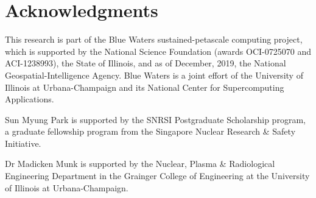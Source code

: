 \section{Acknowledgments}

This research is part of the Blue Waters sustained-petascale computing project,
which is supported by the National Science Foundation (awards OCI-0725070 and
ACI-1238993), the State of Illinois, and as of December, 2019, the National
Geospatial-Intelligence Agency. Blue Waters is a joint effort of the University
of Illinois at Urbana-Champaign and its National Center for Supercomputing
Applications.

Sun Myung Park is supported by the SNRSI Postgraduate Scholarship program, a
graduate fellowship program from the Singapore Nuclear Research \& Safety
Initiative.

Dr Madicken Munk is supported by the Nuclear, Plasma \& Radiological
Engineering Department in the Grainger College of Engineering at the University
of Illinois at Urbana-Champaign.
